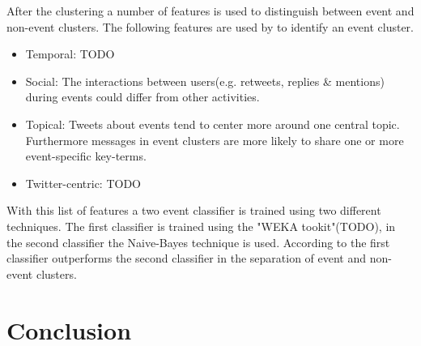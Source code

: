 \documentclass{article}
\begin{document}
After the clustering a number of features is used to distinguish between event and non-event clusters. The following features are used by \cite{eventident} to identify an event cluster. 
\begin{itemize}
  \item Temporal: TODO
  \item Social: The interactions between users(e.g. retweets, replies \& mentions) during events could differ from other activities. 
  \item Topical: Tweets about events tend to center more around one central topic. Furthermore messages in event clusters are more likely to share one or more event-specific key-terms.  
  \item Twitter-centric: TODO
\end{itemize}
With this list of features a two event classifier is trained using two different techniques. The first classifier is trained using the "WEKA tookit"(TODO), in the second classifier the  Naive-Bayes technique is used. According to \cite{eventident} the first classifier outperforms the second classifier in the separation of event and non-event clusters. 
\section{Conclusion}



\end{document}
